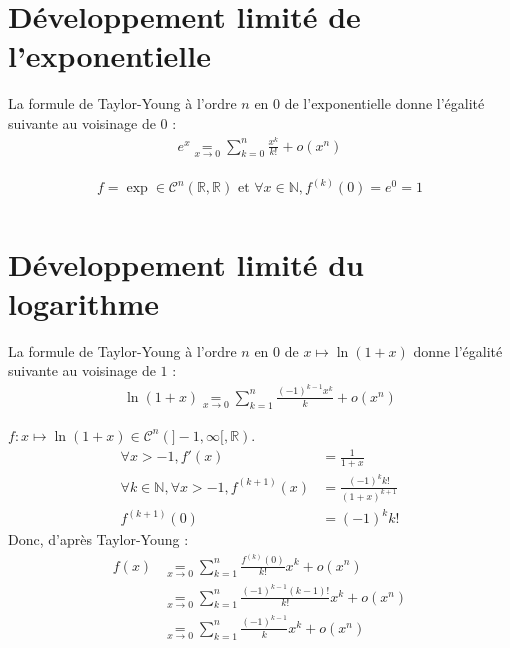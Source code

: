 \documentclass[../main.tex]{subfiles}
\begin{document}
\section{Développement limité de l'exponentielle}
\begin{tcolorbox}[title=Propostion 25.28, title filled=false, colframe=lightblue, colback=lightblue!10!white]
    La formule de Taylor-Young à l'ordre $n$ en $0$ de l'exponentielle donne l'égalité suivante au voisinage de $0$ :
    \begin{align*}
        e^x\underset{x\to 0}{=} \sum_{k=0}^{n} \frac{x^k}{k!} + o(x^n)
    \end{align*}
\end{tcolorbox}

\begin{align*}
    f = \exp \in \mathcal{C}^n(\mathbb{R}, \mathbb{R}) \text{ et } \forall x \in \mathbb{N}, f^{(k)}(0) = e^0 = 1 \\
\end{align*}

\section{Développement limité du logarithme}
\begin{tcolorbox}[title=Propostion 25.29, title filled=false, colframe=lightblue, colback=lightblue!10!white]
    La formule de Taylor-Young à l'ordre $n$ en $0$ de $x\mapsto \ln (1 + x)$ donne l'égalité suivante au voisinage de $1$ :
    \begin{align*}
        \ln (1 + x) \underset{x\to 0}{=} \sum_{k=1}^{n} \frac{(-1)^{k-1}x^k}{k} + o(x^n)
    \end{align*}
\end{tcolorbox}

\noindent $f:x\mapsto \ln(1+x) \in \mathcal{C}^n(]-1, \infty[, \mathbb{R})$. \\
\begin{align*}
    \forall x > -1, f'(x) &= \frac{1}{1+x} \\
    \forall k \in \mathbb{N}, \forall x > -1, f^{(k+1)}(x) &= \frac{(-1)^k k!}{(1+x)^{k+1}} \\
    f^{(k+1)}(0) &= (-1)^k k!
\end{align*}
Donc, d'après Taylor-Young :
\begin{align*}
    f(x) &\underset{x\to 0}{=} \sum_{k=1}^{n} \frac{f^{(k)}(0)}{k!}x^k + o(x^n) \\
    &\underset{x\to 0}{=} \sum_{k=1}^{n} \frac{(-1)^{k-1}(k-1)!}{k!}x^k + o(x^n) \\
    &\underset{x\to 0}{=} \sum_{k=1}^{n} \frac{(-1)^{k-1}}{k}x^k + o(x^n)
\end{align*}
\end{document}
